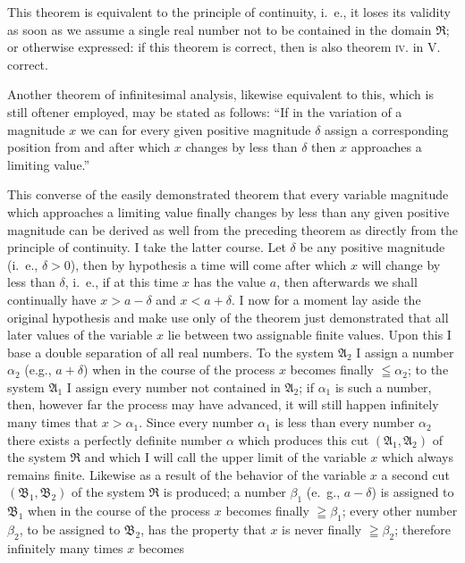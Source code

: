 \documentclass[twoside,openright]{article}
\begin{document}
This theorem is equivalent to the principle of continuity, i.~e., it
loses its validity as soon as we assume a single real number not to be
contained in the domain $\mathfrak{R}$; or otherwise expressed: if
this theorem is correct, then is also theorem \textsc{iv}. in
V. correct.

Another theorem of infinitesimal analysis, likewise equivalent to
this, which is still oftener employed, may be stated as follows: ``If
in the variation of a magnitude $x$ we can for every given positive
magnitude $\delta$ assign a corresponding position from and after
which $x$ changes by less than $\delta$ then $x$ approaches a limiting
value.''

This converse of the easily demonstrated theorem that every variable
magnitude which approaches a limiting value finally changes by less
than any given positive magnitude can be derived as well from the
preceding theorem as directly from the principle of continuity.  I
take the latter course.  Let $\delta$ be any positive magnitude
(i.~e., $\delta>0$), then by hypothesis a time will come after which
$x$ will change by less than $\delta$, i.~e., if at this time $x$ has
the value $a$, then afterwards we shall continually have $x>a-\delta$
and $x<a+\delta$.  I now for a moment lay aside the original
hypothesis and make use only of the theorem just demonstrated that all
later values of the variable $x$ lie between two assignable finite
values. Upon this I base a double separation of all real numbers.  To
the system $\mathfrak{A}_2$ I assign a number $\alpha_2$ (e.g.,
$a+\delta$) when in the course of the process $x$ becomes finally
$\leqq \alpha_2$; to the system $\mathfrak{A}_1$ I assign every number
not contained in $\mathfrak{A}_2$; if $\alpha_1$ is such a number,
then, however far the process may have advanced, it will still happen
infinitely many times that $x>\alpha_1$.  Since every number
$\alpha_1$ is less than every number $\alpha_2$ there exists a
perfectly definite number $\alpha$ which produces this cut
$(\mathfrak{A}_1, \mathfrak{A}_2)$ of the system $\mathfrak{R}$ and
which I will call the upper limit of the variable $x$ which always
remains finite.  Likewise as a result of the behavior of the variable
$x$ a second cut $(\mathfrak{B}_1, \mathfrak{B}_2)$ of the system
$\mathfrak{R}$ is produced; a number $\beta_1$ (e.~g., $a-\delta$) is
assigned to $\mathfrak{B}_1$ when in the course of the process $x$
becomes finally $\geqq\beta_1$; every other number $\beta_2$, to be
assigned to $\mathfrak{B}_2$, has the property that $x$ is never
finally $\geqq \beta_2$; therefore infinitely many times $x$ becomes
\end{document}
